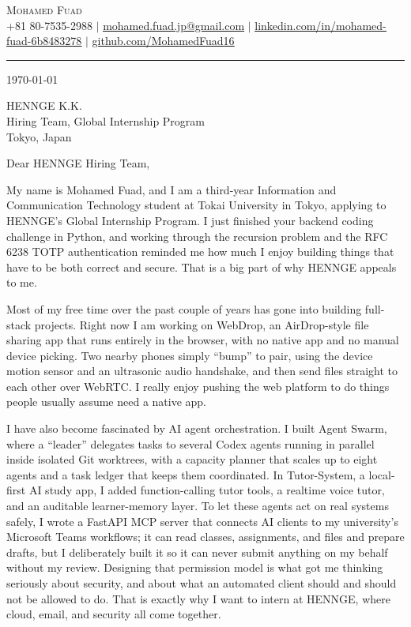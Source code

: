 \documentclass[letterpaper,11pt]{article}
\begin{document}
\begin{center}
    {\Huge \scshape Mohamed Fuad} \\ \vspace{3pt}
    \small
    +81 80-7535-2988 $|$
    \href{mailto:mohamed.fuad.jp@gmail.com}{\underline{mohamed.fuad.jp@gmail.com}} $|$
    \href{https://linkedin.com/in/mohamed-fuad-6b8483278}{\underline{linkedin.com/in/mohamed-fuad-6b8483278}} $|$
    \href{https://github.com/MohamedFuad16}{\underline{github.com/MohamedFuad16}}
\end{center}

\vspace{10pt}
\hrule
\vspace{14pt}

\today

\vspace{8pt}

HENNGE K.K. \\
Hiring Team, Global Internship Program \\
Tokyo, Japan

\vspace{8pt}

Dear HENNGE Hiring Team,

My name is Mohamed Fuad, and I am a third-year Information and Communication Technology student at Tokai University in Tokyo, applying to HENNGE's Global Internship Program. I just finished your backend coding challenge in Python, and working through the recursion problem and the RFC 6238 TOTP authentication reminded me how much I enjoy building things that have to be both correct and secure. That is a big part of why HENNGE appeals to me.

Most of my free time over the past couple of years has gone into building full-stack projects. Right now I am working on WebDrop, an AirDrop-style file sharing app that runs entirely in the browser, with no native app and no manual device picking. Two nearby phones simply ``bump'' to pair, using the device motion sensor and an ultrasonic audio handshake, and then send files straight to each other over WebRTC. I really enjoy pushing the web platform to do things people usually assume need a native app.

I have also become fascinated by AI agent orchestration. I built Agent Swarm, where a ``leader'' delegates tasks to several Codex agents running in parallel inside isolated Git worktrees, with a capacity planner that scales up to eight agents and a task ledger that keeps them coordinated. In Tutor-System, a local-first AI study app, I added function-calling tutor tools, a realtime voice tutor, and an auditable learner-memory layer. To let these agents act on real systems safely, I wrote a FastAPI MCP server that connects AI clients to my university's Microsoft Teams workflows; it can read classes, assignments, and files and prepare drafts, but I deliberately built it so it can never submit anything on my behalf without my review. Designing that permission model is what got me thinking seriously about security, and about what an automated client should and should not be allowed to do. That is exactly why I want to intern at HENNGE, where cloud, email, and security all come together.
\end{document}
